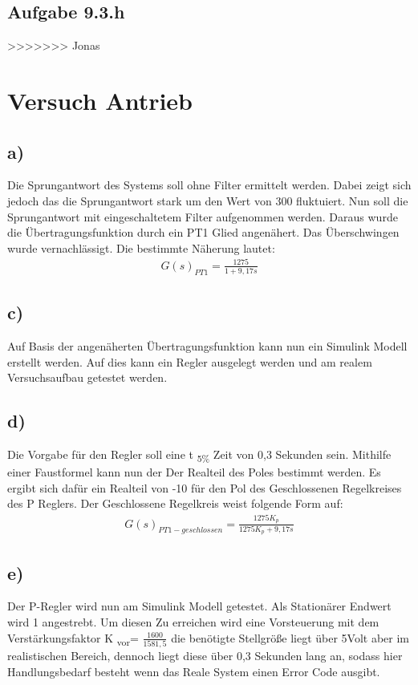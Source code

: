 \documentclass[10pt]{scrartcl}
\begin{document}
\subsection{Aufgabe 9.3.h}
>>>>>>> Jonas

\section{Versuch Antrieb}
\subsection{a)}	Die Sprungantwort des Systems soll ohne Filter ermittelt werden. Dabei zeigt sich jedoch das die Sprungantwort stark um den Wert von 300 fluktuiert.
	Nun soll die Sprungantwort mit eingeschaltetem Filter aufgenommen werden. Daraus wurde die Übertragungsfunktion durch ein PT1 Glied angenähert. Das Überschwingen wurde vernachlässigt. Die bestimmte Näherung lautet: 
\begin{align}
   G(s)_{PT1}=\frac{1275}{1+9,17s}
\end{align}
\subsection{c)}	Auf Basis der angenäherten Übertragungsfunktion kann nun ein Simulink Modell erstellt werden. Auf dies kann ein Regler ausgelegt werden und am realem Versuchsaufbau getestet werden.
\subsection{d)}	Die Vorgabe für den Regler soll eine t \textsubscript{5\%} Zeit von 0,3 Sekunden sein. Mithilfe einer Faustformel kann nun der Der Realteil des Poles bestimmt werden. Es ergibt sich dafür ein Realteil von -10 für den Pol des Geschlossenen Regelkreises des P Reglers. Der Geschlossene Regelkreis weist folgende Form auf:
\begin{align}
   G(s)_{PT1-geschlossen}=\frac{1275K_p}{1275K_p+9,17s}
\end{align}
\subsection{e)}	Der P-Regler wird nun am Simulink Modell getestet. Als Stationärer Endwert wird 1 angestrebt. Um diesen Zu erreichen wird eine Vorsteuerung mit dem Verstärkungsfaktor K \textsubscript{vor}= $ \frac{1600}{1581,5} $ die benötigte Stellgröße liegt über 5Volt aber im realistischen Bereich, dennoch liegt diese über 0,3 Sekunden lang an, sodass hier Handlungsbedarf besteht wenn das Reale System einen Error Code ausgibt.
\end{document}
